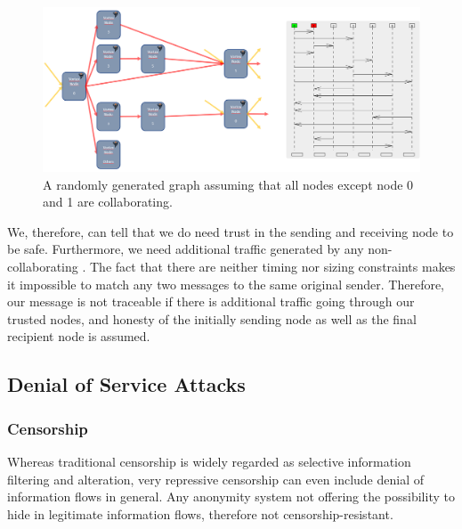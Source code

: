 \begin{figure}[!t]\centering
	\includegraphics[width=1\textwidth]{inc/reducedMessageGraphPaths}
	\caption{A randomly generated graph assuming that all nodes except node 0 and 1 are collaborating.}
	\label{fig:reducedMessageGraphPaths}
\end{figure}

We, therefore, can tell that we do need trust in the sending and receiving node to be safe. Furthermore, we need additional traffic generated by any non-collaborating \VortexNode{}. The fact that there are neither timing nor sizing constraints makes it impossible to match any two messages to the same original sender. Therefore, our message is not traceable if there is additional traffic going through our trusted nodes, and honesty of the initially sending node as well as the final recipient node is assumed.

\subsection{Denial of Service Attacks}
\subsubsection{Censorship}
Whereas traditional censorship is widely regarded as selective information filtering and alteration, very repressive censorship can even include denial of information flows in general. Any anonymity system not offering the possibility to hide in legitimate information flows, therefore not censorship-resistant.

